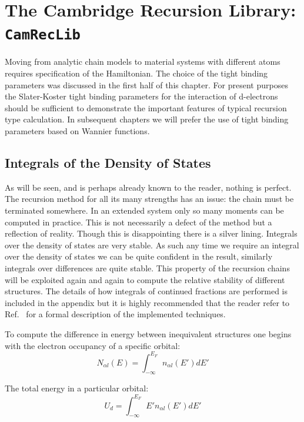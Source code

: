 \section{The Cambridge Recursion Library: \texttt {CamRecLib}}
Moving from analytic chain models to material systems with different atoms requires specification
of the Hamiltonian. The choice of the tight binding parameters was discussed in the first half of this
chapter. For present purposes the Slater-Koster tight binding parameters for the interaction of 
d-electrons should be sufficient to demonstrate the important features of typical recursion type calculation.
In subsequent chapters we will prefer the use of tight binding parameters based on Wannier functions.

\subsection{Integrals of the Density of States}
%
As will be seen, and is perhaps already known to the reader, nothing is perfect. The
recursion method for all its many strengths has an issue: the chain must be terminated
somewhere. In an extended system only so many moments can be computed in practice.  
This is not necessarily a defect of the method but a reflection of reality. Though
this is disappointing there is a silver lining. Integrals over the density of states
are very stable. As such any time we require an integral over the density of states
we can be quite confident in the result, similarly integrals over differences
are quite stable. This property of the recursion chains will be exploited again and again
to compute the relative stability of different structures. The details of how
integrals of continued fractions are performed is included in the appendix 
but it is highly recommended that the reader refer to Ref.~\cite{nex78}
for a formal description of the implemented techniques.

To compute the difference in energy between inequivalent structures 
one begins with the electron occupancy of a specific orbital:
%
\begin{equation}
N_{\alpha l}(E) = \int_{-\infty}^{E_{F}} n_{\alpha l}(E') dE'
\end{equation}
%

The total energy in a particular orbital:
%
\begin{equation}
U_{d} = \int_{-\infty}^{E_{F}}E'n_{\alpha l}(E') dE'
\end{equation}
%

